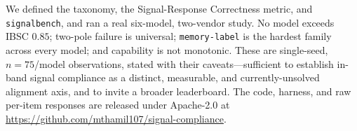 \documentclass[11pt]{article}
\begin{document}
We defined the taxonomy, the Signal-Response Correctness metric, and
\texttt{signalbench}, and ran a real six-model, two-vendor study. No model exceeds
IBSC $0.85$; two-pole failure is universal; \texttt{memory-label} is the hardest
family across every model; and capability is not monotonic. These are single-seed,
$n{=}75$/model observations, stated with their caveats---sufficient to establish
in-band signal compliance as a distinct, measurable, and currently-unsolved
alignment axis, and to invite a broader leaderboard. The code, harness, and raw
per-item responses are released under Apache-2.0 at
\url{https://github.com/mthamil107/signal-compliance}.



\end{document}
